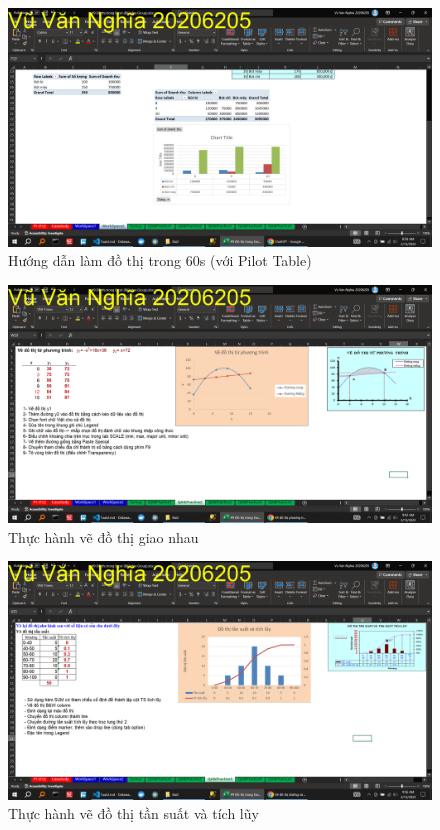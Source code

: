 \documentclass{article}
\begin{document}
\begin{figure}[H]
\centering
\includegraphics[scale = 0.15]{Bai2/HuongDan/4.png}
\caption{Hướng dẫn làm đồ thị trong 60s (với Pilot Table)}
\end{figure}

\begin{figure}[H]
\centering
\includegraphics[scale = 0.15]{Bai2/ThucHanh/0.png}
\caption{Thực hành vẽ đồ thị giao nhau}
\end{figure}

\begin{figure}[H]
\centering
\includegraphics[scale = 0.15]{Bai2/ThucHanh/1.png}
\caption{Thực hành vẽ đồ thị tần suất và tích lũy}
\end{figure}
\end{document}
